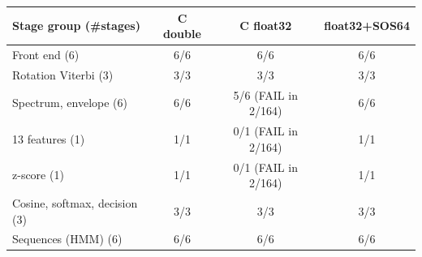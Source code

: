 
\begin{tabular}{@{}lccc@{}}
\toprule
Stage group (\#stages) & C double & C float32 & float32+SOS64 \\
\midrule
Front end (6) & 6/6 & 6/6 & 6/6 \\
Rotation Viterbi (3) & 3/3 & 3/3 & 3/3 \\
Spectrum, envelope (6) & 6/6 & 5/6 (FAIL in 2/164) & 6/6 \\
13 features (1) & 1/1 & 0/1 (FAIL in 2/164) & 1/1 \\
z-score (1) & 1/1 & 0/1 (FAIL in 2/164) & 1/1 \\
Cosine, softmax, decision (3) & 3/3 & 3/3 & 3/3 \\
Sequences (HMM) (6) & 6/6 & 6/6 & 6/6 \\
\bottomrule
\end{tabular}
